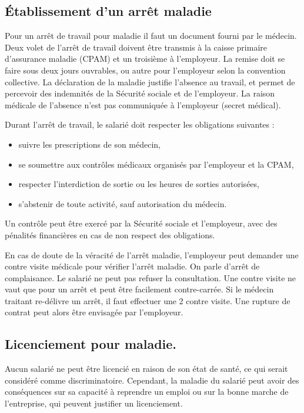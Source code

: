\subsection{Établissement d'un arrêt maladie}
	Pour un arrêt de travail pour maladie il faut un document fourni par le médecin.
	Deux volet de l'arrêt de travail doivent être transmis à la caisse primaire d'assurance maladie (CPAM) et un troisième à l'employeur.
	La remise doit se faire sous deux jours ouvrables, ou autre pour l'employeur selon la convention collective.
	La déclaration de la maladie justifie l'absence au travail, et permet de percevoir des indemnités de la Sécurité sociale et de l'employeur.
	La raison médicale de l’absence n’est pas communiquée à l’employeur (secret médical).

	Durant l'arrêt de travail, le salarié doit respecter les obligations suivantes :
	\begin{itemize}
		\item[\textbullet] suivre les prescriptions de son médecin,
		\item[\textbullet] se soumettre aux contrôles médicaux organisés par l'employeur et la CPAM,
		\item[\textbullet] respecter l'interdiction de sortie ou les heures de sorties autorisées,
		\item[\textbullet] s'abstenir de toute activité, sauf autorisation du médecin.
	\end{itemize}

	Un contrôle peut être exercé par la Sécurité sociale et l'employeur, avec des pénalités financières en cas de non respect des obligations.

	En cas de doute de la véracité de l’arrêt maladie, l’employeur peut demander une contre visite médicale pour vérifier l’arrêt maladie.
	On parle d'arrêt de complaisance.
	Le salarié ne peut pas refuser la consultation.
	Une contre visite ne vaut que pour un arrêt et peut être facilement contre-carrée.
	Si le médecin traitant re-délivre un arrêt, il faut effectuer une 2 contre visite.
	Une rupture de contrat peut alors être envisagée par l'employeur.

\subsection{Licenciement pour maladie.}
	Aucun salarié ne peut être licencié en raison de son état de santé, ce qui serait considéré comme discriminatoire.
	Cependant, la maladie du salarié peut avoir des conséquences sur sa capacité à reprendre un emploi ou sur la bonne marche de l'entreprise, qui peuvent justifier un licenciement.

